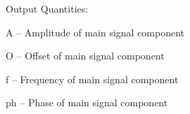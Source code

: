 \begin{tightdesc}
\begin{tightdesc}
\begin{tightdesc}
        \end{tightdesc}
    \end{tightdesc}
\item [Output Quantities:] \rule{0em}{0em}
    \begin{tightdesc}
        \item[\textsf{A}] -- Amplitude of main signal component
        \item[\textsf{O}] -- Offset of main signal component
        \item[\textsf{f}] -- Frequency of main signal component
        \item[\textsf{ph}] -- Phase of main signal component
    \end{tightdesc}
\end{tightdesc}
